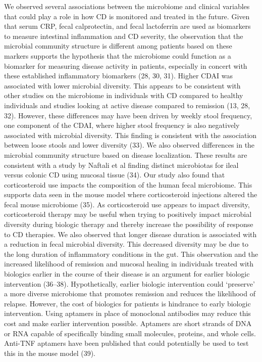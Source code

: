 \documentclass[11pt,]{article}
\begin{document}
We observed several associations between the microbiome and clinical
variables that could play a role in how CD is monitored and treated in
the future. Given that serum CRP, fecal calprotectin, and fecal
lactoferrin are used as biomarkers to measure intestinal inflammation
and CD severity, the observation that the microbial community structure
is different among patients based on these markers supports the
hypothesis that the microbiome could function as a biomarker for
measuring disease activity in patients, especially in concert with these
established inflammatory biomarkers (28, 30, 31). Higher CDAI was
associated with lower microbial diversity. This appears to be consistent
with other studies on the microbiome in individuals with CD compared to
healthy individuals and studies looking at active disease compared to
remission (13, 28, 32). However, these differences may have been driven
by weekly stool frequency, one component of the CDAI, where higher stool
frequency is also negatively associated with microbial diversity. This
finding is consistent with the association between loose stools and
lower diversity (33). We also observed differences in the microbial
community structure based on disease localization. These results are
consistent with a study by Naftali et al finding distinct microbiotas
for ileal versus colonic CD using mucosal tissue (34). Our study also
found that corticosteroid use impacts the composition of the human fecal
microbiome. This supports data seen in the mouse model where
corticosteroid injections altered the fecal mouse microbiome (35). As
corticosteroid use appears to impact diversity, corticosteroid therapy
may be useful when trying to positively impact microbial diversity
during biologic therapy and thereby increase the possibility of response
to CD therapies. We also observed that longer disease duration is
associated with a reduction in fecal microbial diversity. This decreased
diversity may be due to the long duration of inflammatory conditions in
the gut. This observation and the increased likelihood of remission and
mucosal healing in individuals treated with biologics earlier in the
course of their disease is an argument for earlier biologic intervention
(36--38). Hypothetically, earlier biologic intervention could `preserve'
a more diverse microbiome that promotes remission and reduces the
likelihood of relapse. However, the cost of biologics for patients is
hindrance to early biologic intervention. Using aptamers in place of
monoclonal antibodies may reduce this cost and make earlier intervention
possible. Aptamers are short strands of DNA or RNA capable of
specifically binding small molecules, proteins, and whole cells.
Anti-TNF aptamers have been published that could potentially be used to
test this in the mouse model (39).
\end{document}
